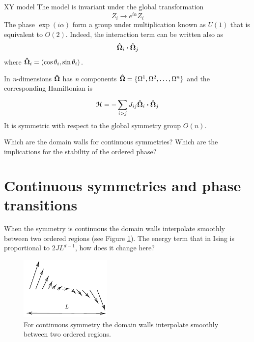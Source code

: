 \documentclass[../main/main.tex]{subfiles}
\begin{document}
\begin{example}{XY model}{}
The model is invariant under the global transformation
\begin{equation}
  Z_i \rightarrow e^{i \alpha } Z_i
\end{equation}
The phase  \( \exp (i \alpha )  \) form a group under multiplication known as \( U(1) \) that is equivalent to \( O(2) \). Indeed, the interaction term can be written also as
\begin{equation*}
  \vu{\Omega }_i \vdot \vu{\Omega }_j
\end{equation*}
where \( \vu{\Omega }_i = ( \cos \theta _i, \sin \theta _i) \).
\begin{remark}
In \emph{n}-dimensions \( \vu{\Omega } \) has \emph{n} components  \( \vu{\Omega } = \{ \Omega ^1, \Omega ^2, \dots, \Omega ^n \}   \)  and the corresponding Hamiltonian is
\begin{equation}
  \mathcal{H} = - \sum_{i>j}^{} J_{ij} \vu{\Omega }_i \vdot  \vu{\Omega }_j
\end{equation}
It is symmetric with respect to the global symmetry group \( O(n) \).
\end{remark}
\end{example}

 Which are the domain walls for continuous symmetries? Which are the implications for the stability of the ordered phase?

\section{Continuous symmetries and phase transitions}

When the symmetry is continuous the domain walls interpolate smoothly between two ordered regions (see Figure \ref{fig:10_3}).
The energy term that in Ising is proportional to \( 2JL^{d-1} \), how does it change here?

\begin{figure}[h!]
\centering
\includegraphics[width=0.4\textwidth]{../lessons/10_image/3.pdf}
\caption{\label{fig:10_3} For continuous symmetry the domain walls interpolate smoothly between two ordered regions.}
\end{figure}
\end{document}
